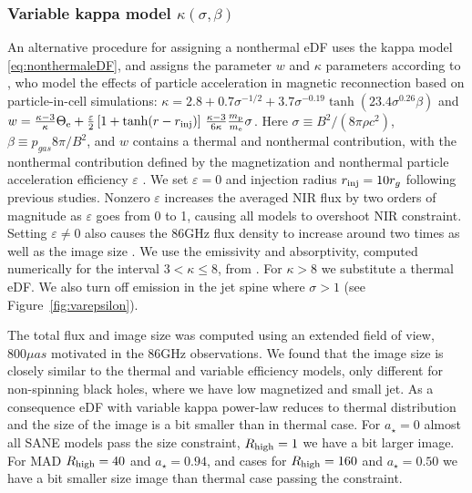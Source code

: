 \subsubsection{Variable kappa model $\kappa(\sigma,\beta)$}


An alternative procedure for assigning a nonthermal eDF uses the  kappa model \eqref{eq:nonthermaleDF}, and assigns the parameter $w$  and $\kappa$ parameters according to \cite{2018ApJ...862...80B}, who model the effects of particle acceleration in magnetic reconnection based on particle-in-cell simulations: $ \kappa=2.8 +0.7\sigma^{-1/2} + 3.7\sigma^{-0.19}\tanh{(23.4\sigma^{0.26} \beta)}\label{eq:kappa}$
and $w= \frac{ \kappa -3 }{\kappa} \Theta_{\rm e} + \frac{\varepsilon}{2}\left[1+\tanh(r-r_{\rm inj})\right]\, \frac{ \kappa -3 }{6 \kappa} \frac{m_{\rm p}}{m_{\rm e}} \sigma$.
Here $\sigma \equiv B^2/(8\pi\rho c^2)$, $\beta \equiv p_{gas} 8 \pi/B^2$, and $w$ contains a thermal and nonthermal contribution, with the nonthermal contribution defined by the magnetization and nonthermal particle acceleration efficiency $\varepsilon$  \citep{2019A&A...632A...2D, 2021NatAs.tmp..218C}. We set  $\varepsilon=0$ and injection radius $r_{\rm inj}=10r_{g}$ following previous studies.  Nonzero $\varepsilon$ increases the averaged NIR flux by two orders of magnitude as $\varepsilon$ goes from 0 to 1, causing all models to overshoot NIR constraint.  Setting $\varepsilon \ne 0$ also causes the 86GHz flux density to increase around two times as well as the image size \citep{2021arXiv211102518F}. We use the emissivity and absorptivity, computed numerically for the interval $3 < \kappa \le 8$, from  \cite{2016ApJ...822...34P}. For $\kappa > 8$ we substitute a thermal eDF.  We also turn off emission in the jet spine where $\sigma > 1$ (see Figure~\ref{fig:varepsilon}).


The total flux and image size was computed using an extended field of view, $800 \mu as$ motivated in the 86GHz observations. We found that the image size is closely similar to the thermal and variable efficiency models, only different for non-spinning black holes, where we have low magnetized and small jet. As a consequence eDF with variable kappa power-law reduces to thermal distribution and the size of the image is a bit smaller than in thermal case. For $a_{\star}=0$ almost all SANE models pass the size constraint, $R_{\rm high}=1$ we have a bit larger image. For MAD $R_{\rm high}=40$ and $a_{\star}=0.94$, and cases for $R_{\rm high}=160$ and $a_{\star}=0.50$ we have a bit smaller size image than thermal case passing the constraint.

